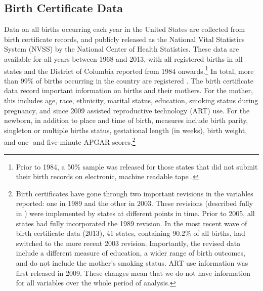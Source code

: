 \documentclass[a4paper, 12 pt]{article}
\theoremstyle{plain}
\begin{document}
\begin{doublespace}
\subsection{Birth Certificate Data}
\label{bqSscn:USAdata}
Data on all births occurring each year in the United States are collected from birth certificate records, and publicly released as the National Vital Statistics System (NVSS) by the National Center of Health Statistics. These data are available for all years between 1968 and 2013, with all registered births in all states and the District of Columbia reported from 1984 onwards.\footnote{Prior to 1984, a 50\% sample was released for those states that did not submit their birth records on electronic, machine readable tape \citep{Martinetal2015}.}  In total, more than 99\% of births occurring in the country are registered \citep{Martinetal2015}. The birth certificate data record important information on births and their mothers. For the mother, this includes age, race, ethnicity, marital status, education, smoking status during pregnancy, and since 2009 assisted reproductive technology (ART) use. For the newborn, in addition to place and time of birth, measures include birth parity, singleton or multiple births status, gestational length (in weeks), birth weight, and one- and five-minute APGAR scores.\footnote{Birth certificates have gone through two important revisions in the variables reported: one in 1989 and the other in 2003.  These revisions (described fully in \citealp{NCHS2000}) were implemented by states at different points in time.  Prior to 2005, all states had fully incorporated the 1989 revision.  In the most recent wave of birth certificate data (2013), 41 states, containing 90.2\% of all births, had switched to the more recent 2003 revision.  Importantly, the revised data include a different measure of education, a wider range of birth outcomes, and do not include the mother's smoking status. ART use information was first released in 2009. These changes mean that we do not have information for all variables over the whole period of analysis.} %



\end{doublespace}
\end{document}
